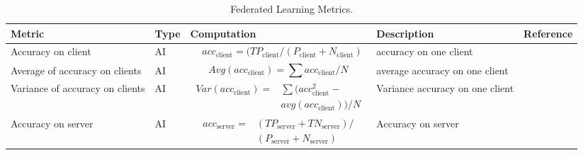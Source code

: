 \begin{table}[h]
\caption{Federated Learning Metrics.} 
\label{tab:fl}
\begin{tabular}{|p{3cm}|l|p{6cm}|p{3cm}|p{1.5cm}|}

\hline
Metric                 & Type      & Computation & Description                                                                & Reference \\ \hline
Accuracy on client
& AI 
& 
\parbox{3cm}{
    \begin{equation} \label{equ:aoc} 
    \begin{split}
& acc_{\text{client}} = (TP_{\text{client}} 
 / (P_{\text{client}} + N_{\text{client}})
    \end{split} 
    \end{equation} 
}
& accuracy on one client 
& \cite{DBLP:conf/iclr/LiSBS20}       
\\ \hline

Average of accuracy on clients
& AI
&
\parbox{3cm}{
    \begin{equation} \label{equ:aoaoc} 
    Avg(acc_{\text{client}}) = \sum acc_{\text{client}} / N
    \end{equation}
}
& average accuracy on one client 
& \cite{DBLP:conf/iclr/LiSBS20}       
\\ \hline

Variance of accuracy on clients
& AI
&
\parbox{3cm}{
    \begin{equation} \label{equ:voaoc} 
    \begin{split}
    Var(acc_{\text{client}}) =
    & \sum (acc_{\text{client}}^2 - \\ 
    & avg(acc_{\text{client}})) / N
    \end{split}
    \end{equation}
}
& Variance accuracy on one client 
& \cite{DBLP:conf/iclr/LiSBS20}       
\\ \hline

Accuracy on server
& AI
&
\parbox{3cm}{
    \begin{equation} \label{equ:aos} 
    \begin{split}
acc_{\text{server}} = 
& (TP_{\text{server}} + TN_{\text{server}}) / \\
& (P_{\text{server}} + N_{\text{server}} )
    \end{split}
    \end{equation}
}
& 
Accuracy on server
& \cite{DBLP:conf/aistats/McMahanMRHA17}
\\ \hline


\end{tabular}
\end{table}
